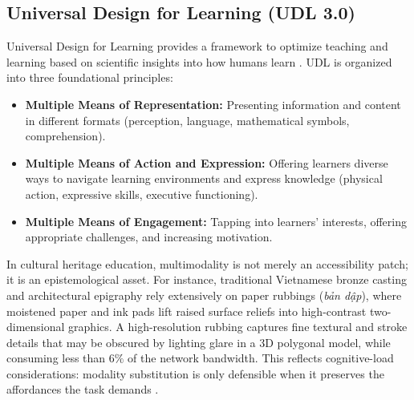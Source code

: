\documentclass[11pt,a4paper]{article}
\begin{document}
\subsection{Universal Design for Learning (UDL 3.0)}
Universal Design for Learning provides a framework to optimize teaching and learning based on scientific insights into how humans learn \cite{rose2002teaching, cast2018udl}. UDL is organized into three foundational principles:
\begin{itemize}
    \item \textbf{Multiple Means of Representation:} Presenting information and content in different formats (perception, language, mathematical symbols, comprehension).
    \item \textbf{Multiple Means of Action and Expression:} Offering learners diverse ways to navigate learning environments and express knowledge (physical action, expressive skills, executive functioning).
    \item \textbf{Multiple Means of Engagement:} Tapping into learners' interests, offering appropriate challenges, and increasing motivation.
\end{itemize}

In cultural heritage education, multimodality is not merely an accessibility patch; it is an epistemological asset. For instance, traditional Vietnamese bronze casting and architectural epigraphy rely extensively on paper rubbings (\textit{bản dập}), where moistened paper and ink pads lift raised surface reliefs into high-contrast two-dimensional graphics. A high-resolution rubbing captures fine textural and stroke details that may be obscured by lighting glare in a 3D polygonal model, while consuming less than $6\%$ of the network bandwidth. This reflects cognitive-load considerations: modality substitution is only defensible when it preserves the affordances the task demands \cite{sweller1998cognitive}.
\end{document}
